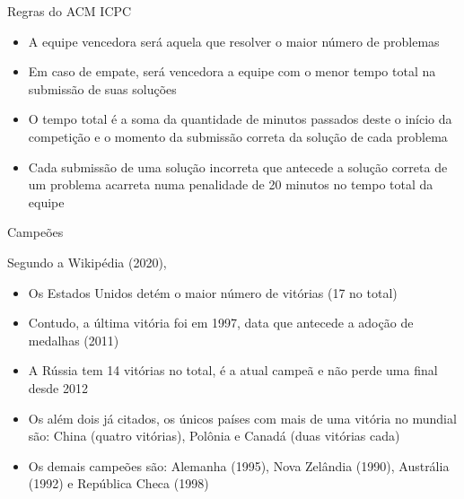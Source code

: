 \begin{frame}[fragile]{Regras do ACM ICPC}

    \begin{itemize}
        \item A equipe vencedora será aquela que resolver o maior número de problemas
        \item Em caso de empate, será vencedora a equipe com o menor tempo total na 
        submissão de suas soluções
        \item O tempo total é a soma da quantidade de minutos passados deste o início da
        competição e o momento da submissão correta da solução de cada problema
        \item Cada submissão de uma solução incorreta que antecede a 
        solução correta de um problema acarreta numa penalidade de 20 minutos no tempo total da
        equipe
    \end{itemize}

\end{frame}

\begin{frame}[fragile]{Campeões}

    Segundo a Wikipédia (2020),

    \begin{itemize}
        \item Os Estados Unidos detém o maior número de vitórias (17 no total)
        \item Contudo, a última vitória foi em 1997, data que antecede a adoção de medalhas (2011)
        \item A Rússia tem 14 vitórias no total, é a atual campeã e não perde uma final desde
            2012
        \item Os além dois já citados, os únicos países com mais de uma vitória no mundial são:
            China (quatro vitórias), Polônia e Canadá (duas vitórias cada)
        \item Os demais campeões são: Alemanha (1995), Nova Zelândia (1990), Austrália (1992)  e
            República Checa (1998)
    \end{itemize}

\end{frame}
